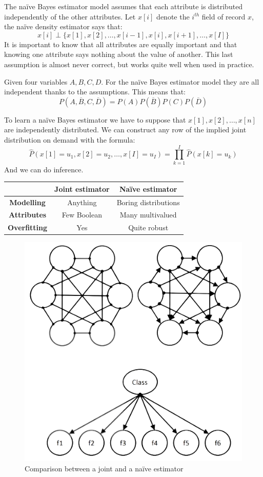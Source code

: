 \documentclass[12pt, a4paper]{report}
\newtheorem[style=M,bodystyle=\normalfont]{theorem}{Theorem}
\newtheorem[style=M,bodystyle=\normalfont]{corollary}{Corollary}
\newtheorem[style=M,bodystyle=\normalfont]{lemma}{Lemma}
\newtheorem[style=M,bodystyle=\normalfont]{definition}{Definition}
\begin{document}
    The naïve Bayes estimator model assumes that each attribute is distributed independently of the other attributes. Let $x[i]$ denote the $i^{th}$ field of record $x$, the naïve
    density estimator says that: 
    \[x[i] \perp \{x[1],x[2],\dots,x[i-1],x[i],x[i+1],\dots,x[I]\}\]
    It is important to know that all attributes are equally important and that knowing one attribute says nothing about the value of another. This last assumption is almost never
    correct, but works quite well when used in practice. 
    \begin{example}
        Given four variables $A,B,C,D$. For the naïve Bayes estimator model they are all independent thanks to the assumptions. This means that: 
        \[P(A,\overline{B},C,\overline{D}) = P(A)P(\overline{B})P(C)P(\overline{D})\]
    \end{example}
    To learn a naïve Bayes estimator we have to suppose that $x[1],x[2],\dots,x[n]$ are independently distributed. We can construct any row of the implied joint distribution on 
    demand with the formula: 
    \[\widehat{P}(x[1]=u_1,x[2]=u_2,\dots,x[I]=u_I) = \prod_{k=1}^{I} \widehat{P}(x[k]=u_k)\]
    And we can do inference.
    \begin{table}[H]
        \centering
        \begin{tabular}{c|c|c|}
        \cline{2-3}
                                                   & \textbf{Joint estimator} & \textbf{Naïve estimator} \\ \hline
        \multicolumn{1}{|c|}{\textbf{Modelling}}   & Anything                 & Boring distributions     \\ \cline{1-1}
        \multicolumn{1}{|c|}{\textbf{Attributes}}  & Few Boolean              & Many multivalued         \\ \cline{1-1}
        \multicolumn{1}{|c|}{\textbf{Overfitting}} & Yes                      & Quite robust             \\ \hline
        \end{tabular}
    \end{table}
    \begin{figure}[H]
        \centering
        \includegraphics[width=0.75\linewidth]{images/naive-joint.png}
        \caption{Comparison between a joint and a naïve estimator}
    \end{figure}
\end{document}
